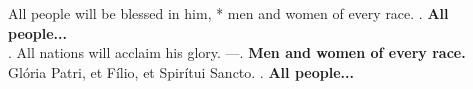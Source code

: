 All people will be blessed in him, * 
men and women of every race.
\Rbar. \textbf{All people...}\\
\Vbar. All nations will acclaim his glory.
---\Rbar. \textbf{Men and women of every race.}\\
Glória Patri, et Fílio,
et Spirítui Sancto.
\Rbar. \textbf{All people...}